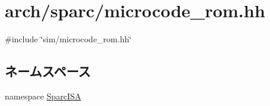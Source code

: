 \hypertarget{arch_2sparc_2microcode__rom_8hh}{
\section{arch/sparc/microcode\_\-rom.hh}
\label{arch_2sparc_2microcode__rom_8hh}
}
{\ttfamily \#include \char`\"{}sim/microcode\_\-rom.hh\char`\"{}}\par
\subsection*{ネームスペース}
\begin{DoxyCompactItemize}
\item 
namespace \hyperlink{namespaceSparcISA}{SparcISA}
\end{DoxyCompactItemize}
